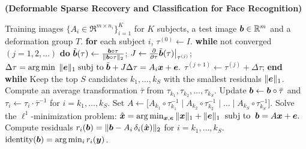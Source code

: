 \documentclass[10pt,twocolumn,letterpaper]{article}
\begin{document}
\begin{algorithm}[thb]
\caption{\bf (Deformable Sparse Recovery and Classification for
Face Recognition)} \label{alg:deformable-src}
\begin{algorithmic}[1]
\begin{small}
 Training images $\{A_i \in \Re^{m\times n_i}\}_{i=1}^K$ for $K$ subjects,  a test image
${\boldsymbol{b}}\in{\mathbb{R}}^m$ and a deformation group $T$. 
\STATE
{\bf for} each subject $i$, 
\STATE \hspace{3mm} $\tau^{(0)}
\leftarrow I$. 
\STATE \hspace{3mm} {\bf while} not converged $(j=1,2,\ldots)$ {\bf do} 
\STATE \hspace{6mm}
$\tilde {{\boldsymbol{b}}}(\tau) \leftarrow \frac{{\boldsymbol{b}} \circ \tau}{\|{\boldsymbol{b}} \circ
\tau\|_2}$; \;\;\; $J \leftarrow  \frac{\partial}{\partial
\tau} \tilde{{\boldsymbol{b}}}(\tau)  \bigr|_{\tau^{(j)}} $;
\STATE \hspace{6mm} $ \Delta \tau =  \arg\min \; \| \boldsymbol{e} \|_1  \;
\textup{subj to} \; \tilde {{\boldsymbol{b}}} + J \Delta \tau = A_i {\boldsymbol{x}} + \boldsymbol{e}.$ 
\STATE
\hspace{6mm} $\tau^{(j+1)} \leftarrow \tau^{(j)} + \Delta
\tau$; 
\STATE \hspace{3mm} {\bf end while}  \STATE Keep
the top $S$ candidates $k_1, \ldots, k_S$ with the smallest
residuals $\|\boldsymbol{e}\|_1$. \STATE Compute an average transformation
$\bar{\tau}$ from $\tau_{k_1}, \tau_{k_2}, \ldots, \tau_{k_S}$.
\STATE Update ${\boldsymbol{b}} \leftarrow {\boldsymbol{b}} \circ \bar{\tau}$ and $\tau_i
\leftarrow \tau_i \cdot \bar{\tau}^{-1}$ for $i = k_1, \dots,
k_S$. \STATE Set $A \leftarrow \big[ A_{k_1} \circ
\tau_{k_1}^{-1} \mid A_{k_2} \circ \tau_{k_2}^{-1} \mid \dots
\mid A_{k_S} \circ \tau_{k_S}^{-1} \big]$. \STATE Solve the
$\ell^1$-minimization problem: \hspace{2mm}
$\hat{{\boldsymbol{x}}} = \arg \min_{{\boldsymbol{x}}, \boldsymbol{e}} \| {\boldsymbol{x}} \|_1 + \|\boldsymbol{e}\|_1 \;\; \textup{subj to} \;\; {\boldsymbol{b}} = A {\boldsymbol{x}} + \boldsymbol{e}.$
\STATE Compute residuals $r_i({\boldsymbol{b}}) = \| {{\boldsymbol{b}}} - {A}_i \, \delta_i(\hat{{\boldsymbol{x}}}) \|_2$ for $i = k_1, \dots, k_S$.
 $\mbox{identity}({\boldsymbol{b}}) = \arg\min_i r_i(\boldsymbol{y})$.
\end{small}
\end{algorithmic}
\end{algorithm}
\end{document}
